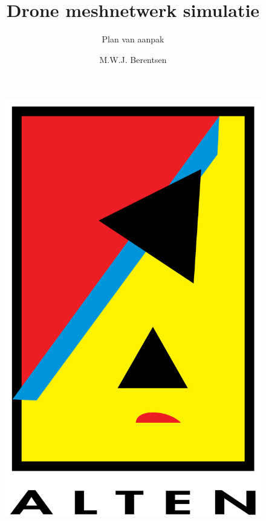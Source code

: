 \documentclass[a4paper, 11pt, oneside]{report}
\author{M.W.J. Berentsen}
\title{\myfont Drone meshnetwerk simulatie}
\subtitle{Plan van aanpak}{Hogeschool van Arnhem en Nijmegen}{HBO Technische Informatica}{561399}{MWJ.Berentsen@student.han.nl}{Versie 2}{Alten Nederland B.V.}{Docent: J. Visch, MSc}{Assessor: ir. C.G.R. van Uffelen}
\begin{document}
\begin{figure}
\begin{center}\includegraphics[scale=0.1]{alten}\end{center}
\end{figure}
\maketitle

\end{document}
